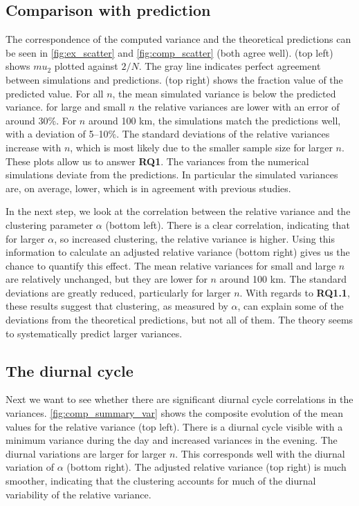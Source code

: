 \documentclass[a4paper, 12pt]{article}
\begin{document}
\subsection{Comparison with prediction}
The correspondence of the computed variance and the theoretical predictions can be seen in \ref{fig:ex_scatter} and \ref{fig:comp_scatter} (both agree well). (top left) shows $mu_2$ plotted against $2/N$. The gray line indicates perfect agreement between simulations and predictions. (top right) shows the fraction value of the predicted value. For all $n$, the mean simulated variance is below the predicted variance. for large and small $n$ the relative variances are lower with an error of around 30\%. For $n$ around 100 km, the simulations match the predictions well, with a deviation of 5--10\%. The standard deviations of the relative variances increase with $n$, which is most likely due to the smaller sample size for larger $n$. These plots allow us to answer \textbf{RQ1}. The variances from the numerical simulations deviate from the predictions. In particular the simulated variances are, on average, lower, which is in agreement with previous studies. 

In the next step, we look at the correlation between the relative variance and the clustering parameter $\alpha$ (bottom left). There is a clear correlation, indicating that for larger $\alpha$, so increased clustering, the relative variance is higher. Using this information to calculate an adjusted relative variance (bottom right) gives us the chance to quantify this effect. The mean relative variances for small and large $n$ are relatively unchanged, but they are lower for $n$ around 100 km. The standard deviations are greatly reduced, particularly for larger $n$. With regards to \textbf{RQ1.1}, these results suggest that clustering, as measured by $\alpha$, can explain some of the deviations from the theoretical predictions, but not all of them. The theory seems to systematically predict larger variances. 

\subsection{The diurnal cycle}
Next we want to see whether there are significant diurnal cycle correlations in the variances. \ref{fig:comp_summary_var} shows the composite evolution of the mean values for the relative variance (top left). There is a diurnal cycle visible with a minimum variance during the day and increased variances in the evening. The diurnal variations are larger for larger $n$. This corresponds well with the diurnal variation of $\alpha$ (bottom right). The adjusted relative variance (top right) is much smoother, indicating that the clustering accounts for much of the diurnal variability of the relative variance. 
\end{document}
